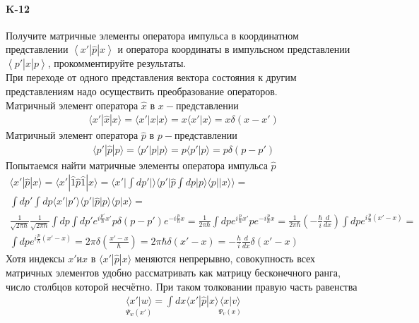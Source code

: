 \documentclass[__main__.tex]{subfiles}
\begin{document}
\paragraph{K-12} Получите матричные элементы оператора импульса в координатном представлении $\left<x'|\hat{p}|x\right>$ и оператора координаты в импульсном представлении $\left<p'|\hat{x}|p\right>$, прокомментируйте результаты.\\

При переходе от одного представления вектора состояния к другим представлениям надо осуществить преобразование операторов.\\
Матричный элемент оператора $\widehat{x}$ в $x-представлении$
\begin{gather*}
\langle x'|\widehat{x}|x\rangle = \langle x'|x|x\rangle = x\langle x'|x\rangle = x\delta(x-x')
\end{gather*}
Матричный элемент оператора $\widehat{p}$ в $p-представлении$
\begin{gather*}
\langle p'|\widehat{p}|p\rangle = \langle p'|p|p\rangle = p\langle p'|p\rangle = p\delta(p-p')
\end{gather*}
Попытаемся найти матричные элементы оператора импульса $\widehat{p}$
\begin{gather*}
\langle x'|\widehat{p}|x\rangle = \langle x'|\widehat{1}\widehat{p}\widehat{1}|x\rangle =  \langle x'|\int{dp'|\rangle\langle p'|\widehat{p}\int{dp|p\rangle\langle p||x\rangle}}\rangle =\\ \int{dp'}\int{dp\langle x'|p'\rangle\langle p'|\widehat{p}|p\rangle\langle p|x\rangle} =\\ \frac{1}{\sqrt{2\pi\hbar}}\frac{1}{\sqrt{2\pi\hbar}}\int{dp}\int{dp'}e^{i\frac{p'}{\hbar}x'}p\delta(p - p')e^{-i\frac{p}{\hbar}x} = \frac{1}{2\pi\hbar}\int{dp}e^{i\frac{p}{\hbar}x'}pe^{-i\frac{p}{\hbar}x} = \frac{1}{2\pi\hbar}(-\frac{\hbar}{i}\frac{d}{dx})\int{dpe^{i\frac{p}{\hbar}(x' - x)}} =\\
\int{dpe^{i\frac{p}{\hbar}(x' - x)}} = 2\pi\delta(\frac{x' - x}{\hbar}) = 2\pi\hbar\delta(x'-x) = -\frac{h}{i}\frac{d}{dx}\delta(x' - x)
\end{gather*}
Хотя индексы $x' и x$ в $\langle x'|\widehat{p}|x\rangle$ меняются непрерывно, совокупность всех матричных элементов удобно рассматривать как матрицу бесконечного ранга, число столбцов которой несчётно. При таком толковании правую часть равенства
\begin{gather*}
\underset{\Psi_w(x')}{\langle x'|w\rangle} = \int{dx\langle x'|\widehat{p}|x\rangle\underset{\Psi_v(x)}{\langle x|v\rangle}}
\end{gather*}
\end{document}
